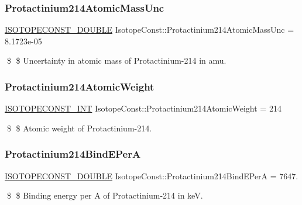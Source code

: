 \subsubsection{\texorpdfstring{Protactinium214\+Atomic\+Mass\+Unc}{Protactinium214AtomicMassUnc}}
{\footnotesize\ttfamily \mbox{\hyperlink{group___isotope_const-_macros_ga8f45a7272ce02c0b4c65c44636ed719a}{I\+S\+O\+T\+O\+P\+E\+C\+O\+N\+S\+T\+\_\+\+D\+O\+U\+B\+LE}} Isotope\+Const\+::\+Protactinium214\+Atomic\+Mass\+Unc = 8.\+1723e-\/05}

\$ \$ Uncertainty in atomic mass of Protactinium-\/214 in amu. \mbox{\label{group___isotope_const-_protactinium-_pa214_gac8175b412cda129aef4f0b36415b22b2}} 
\subsubsection{\texorpdfstring{Protactinium214\+Atomic\+Weight}{Protactinium214AtomicWeight}}
{\footnotesize\ttfamily \mbox{\hyperlink{group___isotope_const-_macros_ga5f18360b3e99483a35c32d789e62621c}{I\+S\+O\+T\+O\+P\+E\+C\+O\+N\+S\+T\+\_\+\+I\+NT}} Isotope\+Const\+::\+Protactinium214\+Atomic\+Weight = 214}

\$ \$ Atomic weight of Protactinium-\/214. \mbox{\label{group___isotope_const-_protactinium-_pa214_ga03e649d8f1a9b422376a1abfe173baa4}} 
\subsubsection{\texorpdfstring{Protactinium214\+Bind\+E\+PerA}{Protactinium214BindEPerA}}
{\footnotesize\ttfamily \mbox{\hyperlink{group___isotope_const-_macros_ga8f45a7272ce02c0b4c65c44636ed719a}{I\+S\+O\+T\+O\+P\+E\+C\+O\+N\+S\+T\+\_\+\+D\+O\+U\+B\+LE}} Isotope\+Const\+::\+Protactinium214\+Bind\+E\+PerA = 7647.}

\$ \$ Binding energy per A of Protactinium-\/214 in keV. \mbox{\label{group___isotope_const-_protactinium-_pa214_gaa502312147f46dc1af28c83fc759bbc1}} 
